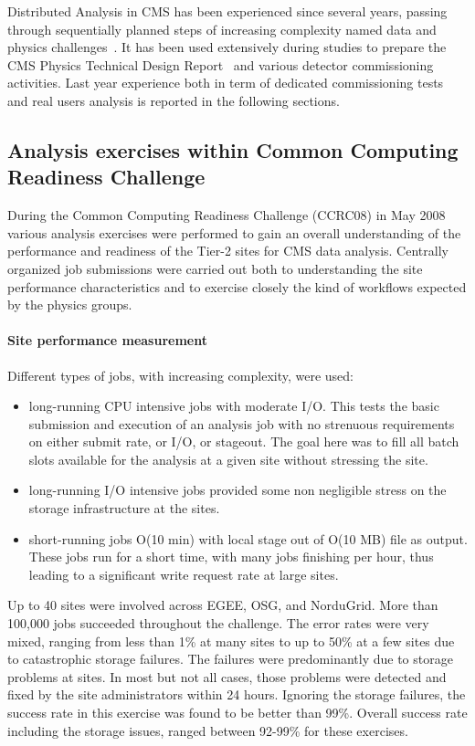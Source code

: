 Distributed Analysis in CMS has been experienced since several years, passing through sequentially planned steps of increasing complexity named data and physics challenges~\cite{RefPastExp}. It has been used extensively during studies to prepare the CMS Physics Technical Design Report~\cite{PTDR} and various detector commissioning activities. 
Last year experience both in term of dedicated commissioning tests and real users analysis is reported in the following sections.

\subsection{Analysis exercises within Common Computing Readiness Challenge}
\label{sec:5_1}
During the Common Computing Readiness Challenge (CCRC08) in May 2008
various analysis exercises were performed to gain an overall understanding 
of the performance and readiness of the Tier-2 sites for CMS data analysis.
Centrally organized job submissions were carried out both to understanding the site performance characteristics and to exercise closely the kind of workflows
expected by the physics groups.
\paragraph{Site performance measurement}
Different types of jobs, with increasing complexity, were used:
\begin{itemize}
\item long-running CPU intensive jobs with moderate I/O. This tests the basic submission and execution of an analysis job with no strenuous requirements on 
either submit rate, or I/O, or stageout. The goal here was to fill all batch slots available for the analysis at a given site without stressing the site.
\item long-running I/O intensive jobs provided some non negligible stress on 
the storage infrastructure at the sites.
\item short-running jobs O(10 min) with local stage out of O(10 MB) file as output. These jobs run for a short time, with many jobs finishing per hour, thus leading to a significant write request rate at large sites.
\end{itemize}
Up to 40 sites were involved across EGEE, OSG, and NorduGrid. More than 100,000 jobs succeeded throughout the challenge. The error rates were very mixed, ranging from less than 1\% at many sites to up to 50\% at a few sites due to
catastrophic storage failures. The failures were predominantly
due to storage problems at sites. In most but not all cases, those problems were detected and fixed by the site administrators within 24 hours. Ignoring the storage failures, the success rate in this exercise was found to be better than 99\%. Overall success rate including the storage issues, ranged between 92-99\% for these exercises.

